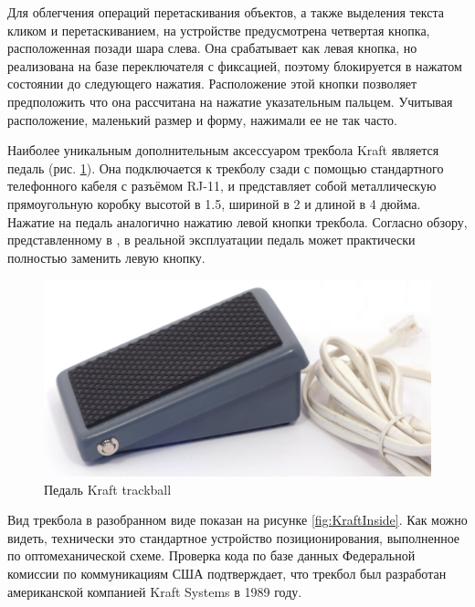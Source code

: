 \documentclass[11pt, a4paper]{article}
\begin{document}
Для облегчения операций перетаскивания объектов, а также выделения текста кликом и перетаскиванием, на устройстве предусмотрена четвертая кнопка, расположенная позади шара слева. Она срабатывает как левая кнопка, но реализована на базе переключателя с фиксацией, поэтому блокируется в нажатом состоянии до следующего нажатия. Расположение этой кнопки позволяет предположить что она рассчитана на нажатие указательным пальцем. Учитывая расположение, маленький размер и форму, нажимали ее не так часто.

Наиболее уникальным дополнительным аксессуаром трекбола Kraft является педаль (рис. \ref{fig:KraftPedal}). Она подключается к трекболу сзади с помощью стандартного телефонного кабеля с разъёмом RJ-11, и представляет собой металлическую прямоугольную коробку высотой в 1.5, шириной в 2 и длиной в 4 дюйма. Нажатие на педаль аналогично нажатию левой кнопки трекбола. Согласно обзору, представленному в \cite{kraftwithpedal}, в реальной эксплуатации педаль может практически полностью заменить левую кнопку.

\begin{figure}[h]
    \centering
    \includegraphics[scale=0.4]{1990_kraft_toptrack/pedal_30.jpg}
    \caption{Педаль Kraft trackball}
    \label{fig:KraftPedal}
\end{figure}

Вид трекбола в разобранном виде показан на рисунке \ref{fig:KraftInside}. Как можно видеть, технически это стандартное устройство позиционирования, выполненное по оптомеханической схеме. Проверка кода по базе данных Федеральной комиссии по коммуникациям США подтверждает, что трекбол был разработан американской компанией Kraft Systems в 1989 году.
\end{document}
